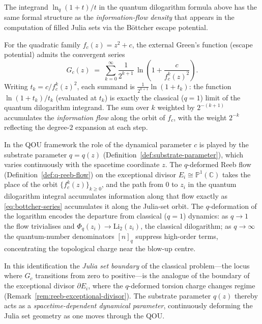 \begin{remark}
\label{rem:qdlog-julia}
The integrand $\ln_q(1+t)/t$ in the quantum dilogarithm formula above has the same formal
structure as the \emph{information-flow density} that appears in the computation of
filled Julia sets via the Böttcher escape potential.

For the quadratic family $f_c(z)=z^2+c$, the external Green's function (escape potential)
admits the convergent series
\begin{equation}\label{eq:bottcher-series}
  G_c(z)
  \;=\;
  \sum_{k=0}^{\infty}
    \frac{1}{2^{k+1}}\,
    \ln\!\left(1+\frac{c}{f_c^k(z)^2}\right).
\end{equation}
Writing $t_k = c/f_c^k(z)^2$, each summand is $\frac{1}{2^{k+1}}\ln(1+t_k)$: the
function $\ln(1+t_k)/t_k$ (evaluated at $t_k$) is exactly the classical ($q=1$) limit
of the quantum dilogarithm integrand.  The sum over $k$ weighted by $2^{-(k+1)}$
accumulates the \emph{information flow} along the orbit of $f_c$, with the weight
$2^{-k}$ reflecting the degree-$2$ expansion at each step.

In the QOU framework the role of the dynamical parameter $c$ is played by the
substrate parameter $q=q(z)$ (Definition~\ref{def:substrate-parameter}), which varies
continuously with the spacetime coordinate $z$.  The $q$-deformed Reeb flow
(Definition~\ref{def:q-reeb-flow}) on the exceptional divisor $E_i \cong \mathbb{P}^1(\mathbb{C})$
takes the place of the orbit $\{f_c^k(z)\}_{k\geq 0}$, and the path from $0$ to $z_i$
in the quantum dilogarithm integral accumulates information along that flow exactly as
\eqref{eq:bottcher-series} accumulates it along the Julia-set orbit.  The
$q$-deformation of the logarithm encodes the departure from classical ($q=1$)
dynamics: as $q\to 1$ the flow trivialises and $\Phi_q(z_i)\to\mathrm{Li}_2(z_i)$,
the classical dilogarithm; as $q\to\infty$ the quantum-number denominators $[n]_q$
suppress high-order terms, concentrating the topological charge near the blow-up centre.

In this identification the \emph{Julia set boundary} of the classical problem---the
locus where $G_c$ transitions from zero to positive---is the analogue of the boundary
of the exceptional divisor $\partial E_i$, where the $q$-deformed torsion charge changes
regime (Remark~\ref{rem:reeb-exceptional-divisor}).  The substrate parameter $q(z)$
thereby acts as a \emph{spacetime-dependent dynamical parameter}, continuously
deforming the Julia set geometry as one moves through the QOU.
\end{remark}

